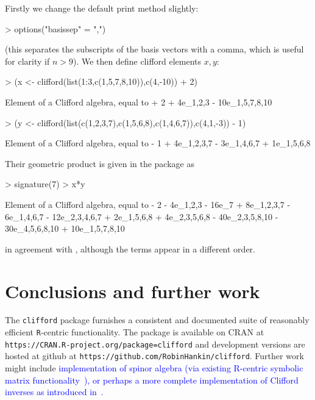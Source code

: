 \documentclass{birkjour}
\theoremstyle{definition}
\theoremstyle{remark}
\numberwithin{equation}{section}
\begin{document}
Firstly we change the default print method slightly:

\begin{Schunk}
\begin{Sinput}
> options("basissep" = ",")
\end{Sinput}
\end{Schunk}

(this separates the subscripts of the basis vectors with a comma,
which is useful for clarity if $n>9$).  We then define clifford
elements $x,y$:

\begin{Schunk}
\begin{Sinput}
> (x <- clifford(list(1:3,c(1,5,7,8,10)),c(4,-10)) + 2)
\end{Sinput}
\begin{Soutput}
Element of a Clifford algebra, equal to
+ 2 + 4e_1,2,3 - 10e_1,5,7,8,10
\end{Soutput}
\begin{Sinput}
> (y <- clifford(list(c(1,2,3,7),c(1,5,6,8),c(1,4,6,7)),c(4,1,-3)) - 1)
\end{Sinput}
\begin{Soutput}
Element of a Clifford algebra, equal to
- 1 + 4e_1,2,3,7 - 3e_1,4,6,7 + 1e_1,5,6,8
\end{Soutput}
\end{Schunk}

Their geometric product is given in the package as

\begin{Schunk}
\begin{Sinput}
> signature(7)
> x*y
\end{Sinput}
\begin{Soutput}
Element of a Clifford algebra, equal to
- 2 - 4e_1,2,3 - 16e_7 + 8e_1,2,3,7 - 6e_1,4,6,7 - 12e_2,3,4,6,7 + 2e_1,5,6,8 +
4e_2,3,5,6,8 - 40e_2,3,5,8,10 - 30e_4,5,6,8,10 + 10e_1,5,7,8,10
\end{Soutput}
\end{Schunk}

in agreement with \cite{ablamowicz2012}, although the terms appear in
a different order.

\section{Conclusions and further work}

The {\tt clifford} package furnishes a consistent and documented suite
of reasonably efficient {\tt R}-centric functionality.  The package is
available on CRAN at
\verb+https://CRAN.R-project.org/package=clifford+ and development
versions are hosted at github at
\verb+https://github.com/RobinHankin/clifford+.  Further work might
include \textcolor{blue}{implementation of spinor algebra (via
  existing R-centric symbolic matrix
  functionality~\cite{hankin2023_jordan,hankin2006_onion}), or perhaps
  a more complete implementation of Clifford inverses as introduced
  in~\cite{hitzer2017}.}
\end{document}
